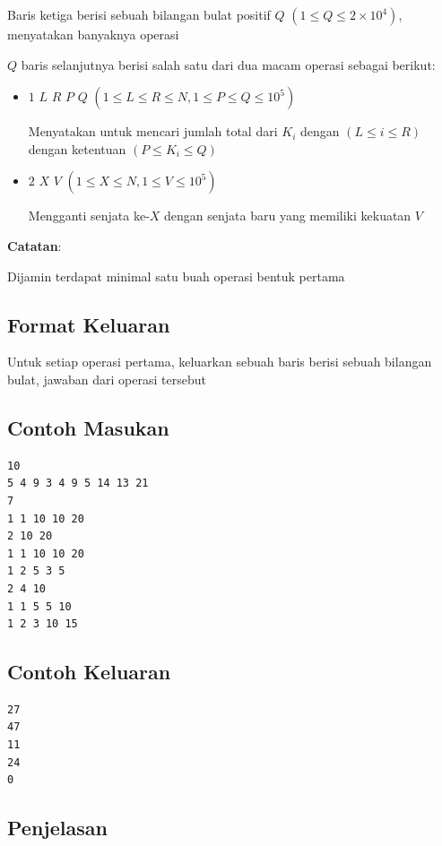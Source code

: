 \documentclass{article}
\begin{document}
Baris ketiga berisi sebuah bilangan bulat positif $Q$ $(1 \leq Q \leq 2 \times 10^4)$, menyatakan banyaknya operasi

$Q$ baris selanjutnya berisi salah satu dari dua macam operasi sebagai berikut:

\begin{itemize}

\item $1$ $L$ $R$ $P$ $Q$ $(1 \leq L \leq R \leq N, 1 \leq P \leq Q \leq 10^5)$

Menyatakan untuk mencari jumlah total dari $K_i$ dengan $(L \leq i \leq R)$ dengan ketentuan $(P \leq K_i \leq Q)$

\item $2$ $X$ $V$ $(1 \leq X \leq N, 1 \leq V \leq 10^5)$

Mengganti senjata ke-$X$ dengan senjata baru yang memiliki kekuatan $V$

\end{itemize}

\textbf{Catatan}:

Dijamin terdapat minimal satu buah operasi bentuk pertama

\subsection*{Format Keluaran}

Untuk setiap operasi pertama, keluarkan sebuah baris berisi sebuah bilangan bulat, jawaban dari operasi tersebut

\begin{multicols}{2}
\subsection*{Contoh Masukan}
\begin{lstlisting}
10
5 4 9 3 4 9 5 14 13 21
7
1 1 10 10 20
2 10 20
1 1 10 10 20
1 2 5 3 5
2 4 10
1 1 5 5 10
1 2 3 10 15

\end{lstlisting}
\columnbreak
\subsection*{Contoh Keluaran}
\begin{lstlisting}
27
47
11
24
0
\end{lstlisting}
\vfill
\null
\end{multicols}

\pagebreak

\subsection*{Penjelasan}
\end{document}
